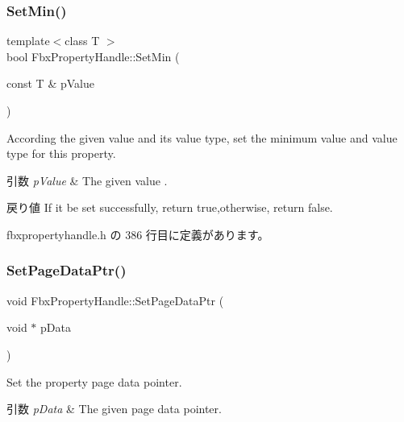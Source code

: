 \subsubsection{\texorpdfstring{Set\+Min()}{SetMin()}\hspace{0.1cm}{\footnotesize\ttfamily [2/2]}}
{\footnotesize\ttfamily template$<$class T $>$ \\
bool Fbx\+Property\+Handle\+::\+Set\+Min (\begin{DoxyParamCaption}\item[{const T \&}]{p\+Value }\end{DoxyParamCaption})\hspace{0.3cm}{\ttfamily [inline]}}

According the given value and its value type, set the minimum value and value type for this property. 
\begin{DoxyParams}{引数}
{\em p\+Value} & The given value . \\
\hline
\end{DoxyParams}
\begin{DoxyReturn}{戻り値}
If it be set successfully, return true,otherwise, return false. 
\end{DoxyReturn}


 fbxpropertyhandle.\+h の 386 行目に定義があります。

\mbox{\label{class_fbx_property_handle_ac980bb1090ea5fd32c9587e3f0b9ac9b}} 
\subsubsection{\texorpdfstring{Set\+Page\+Data\+Ptr()}{SetPageDataPtr()}}
{\footnotesize\ttfamily void Fbx\+Property\+Handle\+::\+Set\+Page\+Data\+Ptr (\begin{DoxyParamCaption}\item[{void $\ast$}]{p\+Data }\end{DoxyParamCaption})}

Set the property page data pointer. 
\begin{DoxyParams}{引数}
{\em p\+Data} & The given page data pointer. \\
\hline
\end{DoxyParams}
\mbox{\label{class_fbx_property_handle_a4ce451166cd44ea838b4e4f1b5a8e8ad}} 
